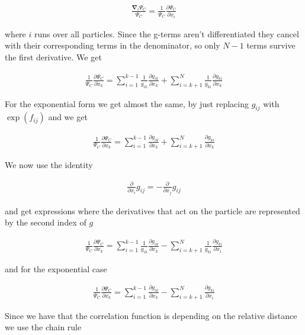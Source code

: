 \documentclass[11pt]{article}
\begin{document}
			\begin{align}
				\frac{\mathbf{\nabla}_{i}\Psi_{C}}{\Psi_{C}}=\frac{1}{\Psi_{C}}\frac{\partial\Psi_{C}}{\partial x_{i}}
			\end{align}

			where $i$ runs over all particles. Since the g-terms aren't differentiated
			they cancel with their corresponding terms in the denominator, so
			only $N-1$ terms survive the first derivative. We get

			\begin{align}
				\frac{1}{\Psi_{C}}\frac{\partial\Psi_{C}}{\partial x_{k}}=\sum_{i=1}^{k-1}\frac{1}{g_{ik}}\frac{\partial g_{ik}}{\partial x_{k}}+\sum_{i=k+1}^{N}\frac{1}{g_{ki}}\frac{\partial g_{ki}}{\partial x_{k}}
			\end{align}

			For the exponential form we get almost the same, by just replacing
			$g_{ij}$ with $\exp\left(f_{ij}\right)$ and we get

			\begin{align}
				\frac{1}{\Psi_{C}}\frac{\partial\Psi_{C}}{\partial x_{k}}=\sum_{i=1}^{k-1}\frac{\partial g_{ik}}{\partial x_{k}}+\sum_{i=k+1}^{N}\frac{\partial g_{ki}}{\partial x_{k}}
			\end{align}

			We now use the identity

			\begin{align}
				\frac{\partial}{\partial x_{i}}g_{ij}=-\frac{\partial}{\partial x_{j}}g_{ij}
			\end{align}

			and get expressions where the derivatives that act on the particle
			are represented by the second index of $g$

			\begin{align}
				\frac{1}{\Psi_{C}}\frac{\partial\Psi_{C}}{\partial x_{k}}=\sum_{i=1}^{k-1}\frac{1}{g_{ik}}\frac{\partial g_{ik}}{\partial x_{k}}-\sum_{i=k+1}^{N}\frac{1}{g_{ki}}\frac{\partial g_{ki}}{\partial x_{i}}
			\end{align}

			and for the exponential case

			\begin{align}
				\frac{1}{\Psi_{C}}\frac{\partial\Psi_{C}}{\partial x_{k}}=\sum_{i=1}^{k-1}\frac{\partial g_{ik}}{\partial x_{k}}-\sum_{i=k+1}^{N}\frac{\partial g_{ki}}{\partial x_{i}}
			\end{align}


			Since we have that the correlation function is depending on the relative
			distance we use the chain rule
\end{document}

